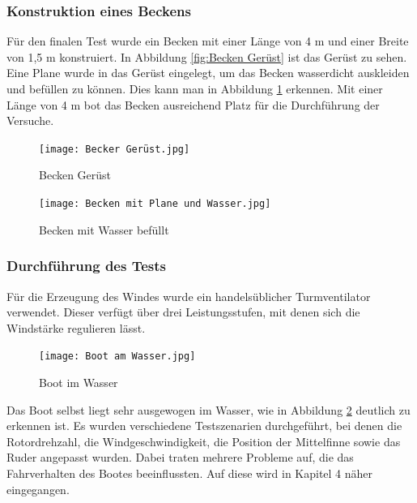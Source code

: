 \documentclass[a4paper,12pt]{article}
\begin{document}
\subsubsection{Konstruktion eines Beckens}

Für den finalen Test wurde ein Becken mit einer Länge von 4 m und einer Breite von 1,5 m konstruiert. In Abbildung \ref{fig:Becken Gerüst} ist das Gerüst zu sehen. Eine Plane wurde in das Gerüst eingelegt, um das Becken wasserdicht auskleiden und befüllen zu können. Dies kann man in Abbildung \ref{fig:Becken mit Wasser befüllt} erkennen. Mit einer Länge von 4 m bot das Becken ausreichend Platz für die Durchführung der Versuche.

\begin{figure}[H]
    \centering
    \begin{minipage}[b]{0.48\linewidth}
        \centering
        \texttt{[image: Becker Gerüst.jpg]}
        \caption{Becken Gerüst}
        \label{fig:Becken Gerüst}
    \end{minipage}
    \hfill
    \begin{minipage}[b]{0.49\linewidth}
        \centering
        \texttt{[image: Becken mit Plane und Wasser.jpg]}
        \caption{Becken mit Wasser befüllt}
        \label{fig:Becken mit Wasser befüllt}
    \end{minipage}
\end{figure}

\subsubsection{Durchführung des Tests}

Für die Erzeugung des Windes wurde ein handelsüblicher Turmventilator verwendet. Dieser verfügt über drei Leistungsstufen, mit denen sich die Windstärke regulieren lässt.

\begin{figure}[H]
    \centering
    \texttt{[image: Boot am Wasser.jpg]}
    \caption{Boot im Wasser}
    \label{fig:Boot im Wasser}
\end{figure}

Das Boot selbst liegt sehr ausgewogen im Wasser, wie in Abbildung \ref{fig:Boot im Wasser} deutlich zu erkennen ist.
Es wurden verschiedene Testszenarien durchgeführt, bei denen die Rotordrehzahl, die Windgeschwindigkeit, die Position der Mittelfinne sowie das Ruder angepasst wurden. Dabei traten mehrere Probleme auf, die das Fahrverhalten des Bootes beeinflussten. Auf diese wird in Kapitel 4 näher eingegangen.
\end{document}
